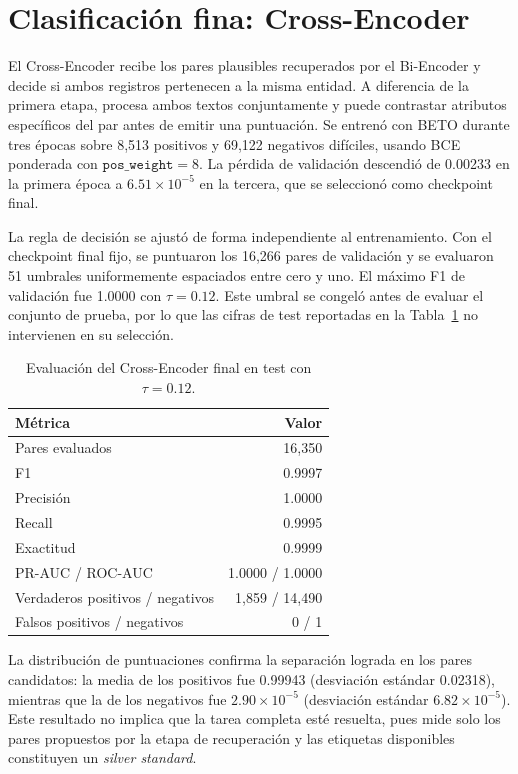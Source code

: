 \section{Clasificación fina: Cross-Encoder}

El Cross-Encoder recibe los pares plausibles recuperados por el Bi-Encoder y decide si ambos registros pertenecen a la misma entidad. A diferencia de la primera etapa, procesa ambos textos conjuntamente y puede contrastar atributos específicos del par antes de emitir una puntuación. Se entrenó con BETO durante tres épocas sobre 8,513 positivos y 69,122 negativos difíciles, usando BCE ponderada con $\texttt{pos\_weight}=8$. La pérdida de validación descendió de 0.00233 en la primera época a $6.51\times10^{-5}$ en la tercera, que se seleccionó como checkpoint final.

La regla de decisión se ajustó de forma independiente al entrenamiento. Con el checkpoint final fijo, se puntuaron los 16,266 pares de validación y se evaluaron 51 umbrales uniformemente espaciados entre cero y uno. El máximo F1 de validación fue 1.0000 con $\tau=0.12$. Este umbral se congeló antes de evaluar el conjunto de prueba, por lo que las cifras de test reportadas en la Tabla~\ref{tab:cross_encoder_results} no intervienen en su selección.

\begin{table}[htbp]
    \centering
    \small
    \caption{Evaluación del Cross-Encoder final en test con $\tau=0.12$.}
    \label{tab:cross_encoder_results}
    \begin{tabular}{l r}
        \hline
        Métrica & Valor \\
        \hline
        Pares evaluados & 16,350 \\
        F1 & 0.9997 \\
        Precisión & 1.0000 \\
        Recall & 0.9995 \\
        Exactitud & 0.9999 \\
        PR-AUC / ROC-AUC & 1.0000 / 1.0000 \\
        Verdaderos positivos / negativos & 1,859 / 14,490 \\
        Falsos positivos / negativos & 0 / 1 \\
        \hline
    \end{tabular}
\end{table}

La distribución de puntuaciones confirma la separación lograda en los pares candidatos: la media de los positivos fue 0.99943 (desviación estándar 0.02318), mientras que la de los negativos fue $2.90\times10^{-5}$ (desviación estándar $6.82\times10^{-5}$). Este resultado no implica que la tarea completa esté resuelta, pues mide solo los pares propuestos por la etapa de recuperación y las etiquetas disponibles constituyen un \textit{silver standard}.


